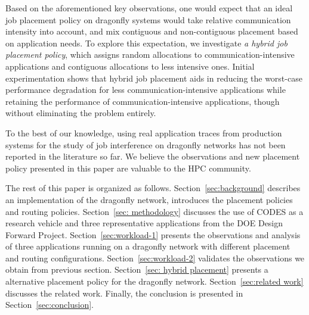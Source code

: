 Based on the aforementioned key observations, one would expect that an ideal job placement policy on dragonfly systems would take relative communication intensity into account, and mix contiguous and non-contiguous placement based on application needs. To explore this expectation, we investigate \emph{a hybrid job placement policy}, which assigns random allocations to communication-intensive applications and contiguous allocations to less intensive ones. Initial experimentation shows that hybrid job placement aids in reducing the worst-case performance degradation for less communication-intensive applications while retaining the performance of communication-intensive applications, though without eliminating the problem entirely.

To the best of our knowledge, using real application traces from production systems for the study of job interference on dragonfly networks has not been reported in the literature so far. We believe the observations and new placement policy presented in this paper are valuable to the HPC community.


The rest of this paper is organized as follows. Section~\ref{sec:background} describes an implementation of the dragonfly network, introduces the placement policies and routing policies. Section~\ref{sec: methodology} discusses the use of CODES as a research vehicle and three representative applications from the DOE Design Forward Project. Section~\ref{sec:workload-1} presents the observations and analysis of three applications running on a dragonfly network with different placement and routing configurations. Section~\ref{sec:workload-2} validates the observations we obtain from previous section. Section~\ref{sec: hybrid placement} presents a alternative placement policy for the dragonfly network. Section~\ref{sec:related work} discusses the related work. Finally, the conclusion is presented in Section~\ref{sec:conclusion}.


